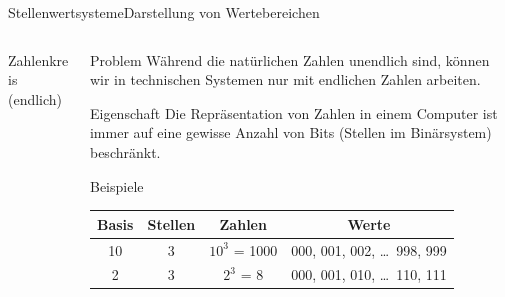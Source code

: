 \documentclass[xelatex,aspectratio=169]{beamer}
\begin{document}
\begin{frame}{Stellenwertsysteme}{Darstellung von Wertebereichen}
  \begin{columns}
    \begin{column}{0.3\textwidth}
      \begin{block}{Zahlenkreis (endlich)}
        \centering
      \end{block}
    \end{column}
    \begin{column}{0.7\textwidth}
      \begin{alertblock}{Problem}
        Während die natürlichen Zahlen unendlich sind, können wir in technischen Systemen nur mit endlichen Zahlen arbeiten.
      \end{alertblock}
      \begin{block}{Eigenschaft}
        Die Repräsentation von Zahlen in einem Computer ist immer auf eine gewisse Anzahl von Bits (Stellen im Binärsystem) beschränkt.
      \end{block}
      \begin{exampleblock}{Beispiele}
        \centering
        \begin{tabular}{cccc}
          \toprule
          \textbf{Basis} & \textbf{Stellen} & \textbf{Zahlen} & \textbf{Werte}                   \\
          \midrule
          10             & 3                & $10^3$ = 1000   & {000, 001, 002, \ldots~998, 999} \\
          2              & 3                & $2^3$ = 8       & {000, 001, 010, \ldots~110, 111} \\
          \bottomrule
        \end{tabular}
      \end{exampleblock}

    \end{column}

  \end{columns}

\end{frame}
\end{document}
